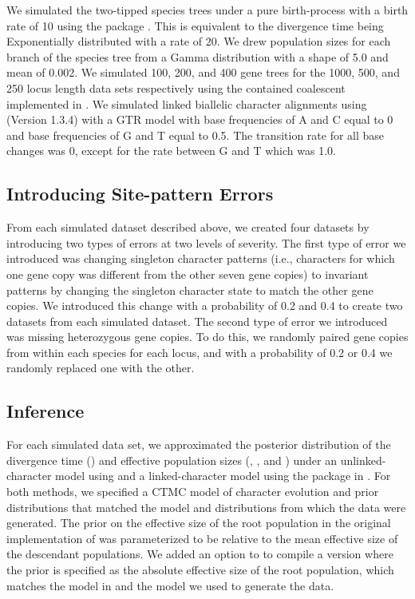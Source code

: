 We simulated the two-tipped species trees under a pure birth-process with a
birth rate of 10 using the \python package
\dendropy
\citep[Version 4.40;  branch commit eb69003;][]{Dendropy}.  
This is equivalent to the divergence time being Exponentially distributed with
a rate of 20.
We drew population sizes for each branch of the species tree from a Gamma 
distribution with a shape of 5.0 and mean of 0.002. We simulated 100, 200, and 
400 gene trees for the 1000, 500, and 250 locus length data sets respectively 
using the contained coalescent implemented in \dendropy.
We simulated linked biallelic character alignments using
\seqgen (Version 1.3.4)
\citep{rambautSeqGenApplicationMonte1997}
with a GTR model with base frequencies of A and C equal to 0 and base 
frequencies of G and T equal to 0.5. The transition rate for all base changes was 
0, except for the rate between G and T which was 1.0. 

\subsection{Introducing Site-pattern Errors}
From each simulated dataset described above, we created four datasets by 
introducing two types of errors at two levels of severity. The first type of 
error we introduced was changing singleton character patterns (i.e., characters 
for which one gene copy was different from the other seven gene copies) to invariant 
patterns by changing the singleton character state to match the other gene 
copies. We introduced this change with a probability of 0.2 and 0.4 to create 
two datasets from each simulated dataset. The second type of error we introduced 
was missing heterozygous gene copies. To do this, we randomly paired gene copies 
from within each species for each locus, and with a probability 
of 0.2 or 0.4 we randomly replaced one with the other.


\subsection{Inference}
For each simulated data set,
we approximated the posterior distribution of the divergence time (\divtime)
and effective population sizes
(\rootpopsize, \tippopsize[1], and \tippopsize[2])
under an
unlinked-character model using
\ecoevolity
\citep[Version 0.3.2; dev branch commit a7e9bf2;][]{Oaks2018ecoevolity}
and a linked-character model using the
\beast
\citep[Version 0.15.1;][]{ogilvieStarBEAST2BringsFaster2017} 
package in
\beastcore
\citep[Version 2.5.2;][]{bouckaertBEASTSoftwarePlatform2014}.
For both methods, we specified a CTMC model of character evolution and prior
distributions that matched the model and distributions from which the data were
generated.
The prior on the effective size of the root population in the original
implementation of \ecoevolity was parameterized to be relative to the mean
effective size of the descendant populations.
We added an option to \ecoevolity to compile a version where the prior is
specified as the absolute effective size of the root population,
which matches the model in \beast and the model we used to generate the data.

